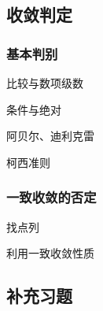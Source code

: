 \documentclass[a4paper,UTF8,fontset=windows,AutoFakeBold]{ctexart}
\theoremstyle{ex}
\begin{document}
\subsection{收敛判定}
\subsubsection{基本判别}
比较与数项级数

条件与绝对

阿贝尔、迪利克雷

柯西准则

\subsubsection{一致收敛的否定}
找点列

利用一致收敛性质

\subsection{补充习题}
\end{document}

